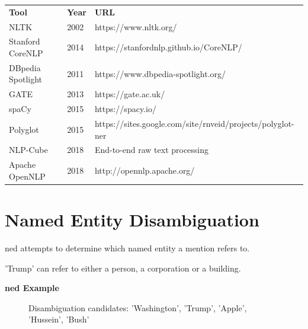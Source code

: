 \begin{mytable}
    \begin{tabular}{p{} p{} p{}}
        \textbf{Tool}     & \textbf{Year} & \textbf{URL}                                               \\

        NLTK              & 2002          & https://www.nltk.org/                                      \\

        Stanford CoreNLP  & 2014          & https://stanfordnlp.github.io/CoreNLP/                     \\

        DBpedia Spotlight & 2011          & https://www.dbpedia-spotlight.org/                         \\

        GATE              & 2013          & https://gate.ac.uk/                                        \\

        spaCy             & 2015          & https://spacy.io/                                          \\

        Polyglot          & 2015          & https://sites.google.com/site/rnveid/projects/polyglot-ner \\

        NLP-Cube          & 2018          & End-to-end raw text processing                             \\

        Apache OpenNLP    & 2018          & http://opennlp.apache.org/                                 \\
    \end{tabular}
    \caption{Common \gls{ner} Tools and APIs.}
    \label{tab:nlp_tools}
\end{mytable}


\section{Named Entity Disambiguation}
\gls{ned} attempts to determine which named entity a mention refers to.
\begin{bsp}
    'Trump' can refer to either a person, a corporation or a building.
\end{bsp}

\begin{bsp}
    \textbf{\gls{ned} Example}
    \begin{figure}[H]
        \caption{Disambiguation candidates: ’Washington’,
            ’Trump’, ’Apple’, ’Hussein’, ’Bush’}
    \end{figure}
\end{bsp}

